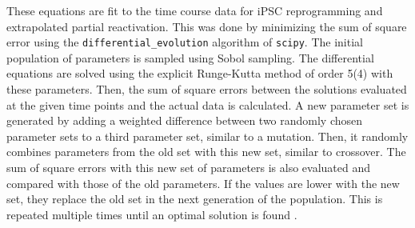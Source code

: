 \documentclass[11pt,a4paper]{article}
\renewcommand{\cite}{\parencite}
\begin{document}
These equations are fit to the time course data for iPSC reprogramming and extrapolated partial reactivation. This was done by minimizing the sum of square error using the \texttt{differential\_evolution} algorithm of \texttt{scipy}. The initial population of parameters is sampled using Sobol sampling. The differential equations are solved using the explicit Runge-Kutta method of order 5(4) with these parameters. Then, the sum of square errors between the solutions evaluated at the given time points and the actual data is calculated. A new parameter set is generated by adding a weighted difference between two randomly chosen parameter sets to a third parameter set, similar to a mutation. Then, it randomly combines parameters from the old set with this new set, similar to crossover. The sum of square errors with this new set of parameters is also evaluated and compared with those of the old parameters. If the values are lower with the new set, they replace the old set in the next generation of the population. This is repeated multiple times until an optimal solution is found \cite{DEalgo}.
\end{document}
